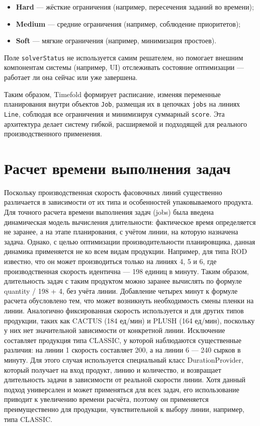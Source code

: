 \begin{itemize}
    \item \textbf{Hard} — жёсткие ограничения (например, пересечения заданий во времени);
    \item \textbf{Medium} — средние ограничения (например, соблюдение приоритетов);
    \item \textbf{Soft} — мягкие ограничения (например, минимизация простоев).
\end{itemize}

Поле \texttt{solverStatus} не используется самим решателем, но помогает внешним компонентам системы (например, UI) отслеживать состояние оптимизации — работает ли она сейчас или уже завершена.

\vspace{1em}

Таким образом, Timefold формирует расписание, изменяя переменные планирования внутри объектов \texttt{Job}, размещая их в цепочках \texttt{jobs} на линиях \texttt{Line}, соблюдая все ограничения и минимизируя суммарный \texttt{score}. Эта архитектура делает систему гибкой, расширяемой и подходящей для реального производственного применения.

\section{Расчет времени выполнения задач}

Поскольку производственная скорость фасовочных линий существенно различается в зависимости от их типа и особенностей упаковываемого продукта. Для точного расчета времени выполнения задач (jobs) была введена динамическая модель вычисления длительности: фактическое время определяется не заранее, а на этапе планирования, с учётом линии, на которую назначена задача. Однако, с целью оптимизации производительности планировщика, данная динамика применяется не ко всем видам продукции. Например, для типа ROD известно, что он может производиться только на линиях 4, 5 и 6, где производственная скорость идентична — 198 единиц в минуту. Таким образом, длительность задач с таким продуктом можно заранее вычислять по формуле quantity / 198 + 4, без учёта линии. Добавление четырех минут к формуле расчета обусловлено тем, что может возникнуть необходимость смены пленки на линии. Аналогично фиксированная скорость используется и для других типов продукции, таких как CACTUS (184 ед/мин) и PLUSH (164 ед/мин), поскольку у них нет значительной зависимости от конкретной линии. Исключение составляет продукция типа CLASSIC, у которой наблюдаются существенные различия: на линии 1 скорость составляет 200, а на линии 6 — 240 сырков в минуту. Для этого случая используется специальный класс DurationProvider, который получает на вход продукт, линию и количество, и возвращает длительность задачи в зависимости от реальной скорости линии. Хотя данный подход универсален и может применяться для всех задач, его использование приводит к увеличению времени расчёта, поэтому он применяется преимущественно для продукции, чувствительной к выбору линии, например, типа CLASSIC.

